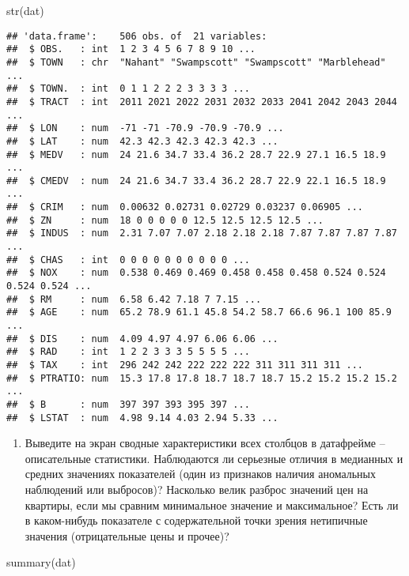 \documentclass[
]{article}
\newenvironment{Shaded}{\begin{snugshade}}{\end{snugshade}}
\newcommand{\FunctionTok}[1]{\textcolor[rgb]{0.00,0.00,0.00}{#1}}
\newcommand{\NormalTok}[1]{#1}
\providecommand{\tightlist}{%
  \setlength{\itemsep}{0pt}\setlength{\parskip}{0pt}}
\begin{document}
\begin{Shaded}
\begin{Highlighting}[]
\FunctionTok{str}\NormalTok{(dat)}
\end{Highlighting}
\end{Shaded}

\begin{verbatim}
## 'data.frame':    506 obs. of  21 variables:
##  $ OBS.   : int  1 2 3 4 5 6 7 8 9 10 ...
##  $ TOWN   : chr  "Nahant" "Swampscott" "Swampscott" "Marblehead" ...
##  $ TOWN.  : int  0 1 1 2 2 2 3 3 3 3 ...
##  $ TRACT  : int  2011 2021 2022 2031 2032 2033 2041 2042 2043 2044 ...
##  $ LON    : num  -71 -71 -70.9 -70.9 -70.9 ...
##  $ LAT    : num  42.3 42.3 42.3 42.3 42.3 ...
##  $ MEDV   : num  24 21.6 34.7 33.4 36.2 28.7 22.9 27.1 16.5 18.9 ...
##  $ CMEDV  : num  24 21.6 34.7 33.4 36.2 28.7 22.9 22.1 16.5 18.9 ...
##  $ CRIM   : num  0.00632 0.02731 0.02729 0.03237 0.06905 ...
##  $ ZN     : num  18 0 0 0 0 0 12.5 12.5 12.5 12.5 ...
##  $ INDUS  : num  2.31 7.07 7.07 2.18 2.18 2.18 7.87 7.87 7.87 7.87 ...
##  $ CHAS   : int  0 0 0 0 0 0 0 0 0 0 ...
##  $ NOX    : num  0.538 0.469 0.469 0.458 0.458 0.458 0.524 0.524 0.524 0.524 ...
##  $ RM     : num  6.58 6.42 7.18 7 7.15 ...
##  $ AGE    : num  65.2 78.9 61.1 45.8 54.2 58.7 66.6 96.1 100 85.9 ...
##  $ DIS    : num  4.09 4.97 4.97 6.06 6.06 ...
##  $ RAD    : int  1 2 2 3 3 3 5 5 5 5 ...
##  $ TAX    : int  296 242 242 222 222 222 311 311 311 311 ...
##  $ PTRATIO: num  15.3 17.8 17.8 18.7 18.7 18.7 15.2 15.2 15.2 15.2 ...
##  $ B      : num  397 397 393 395 397 ...
##  $ LSTAT  : num  4.98 9.14 4.03 2.94 5.33 ...
\end{verbatim}

\begin{enumerate}
\def\labelenumi{\arabic{enumi}.}
\setcounter{enumi}{2}
\tightlist
\item
  Выведите на экран сводные характеристики всех столбцов в датафрейме --
  описательные статистики. Наблюдаются ли серьезные отличия в медианных
  и средних значениях показателей (один из признаков наличия аномальных
  наблюдений или выбросов)? Насколько велик разброс значений цен на
  квартиры, если мы сравним минимальное значение и максимальное? Есть ли
  в каком-нибудь показателе с содержательной точки зрения нетипичные
  значения (отрицательные цены и прочее)?
\end{enumerate}

\begin{Shaded}
\begin{Highlighting}[]
\FunctionTok{summary}\NormalTok{(dat)}
\end{Highlighting}
\end{Shaded}
\end{document}
